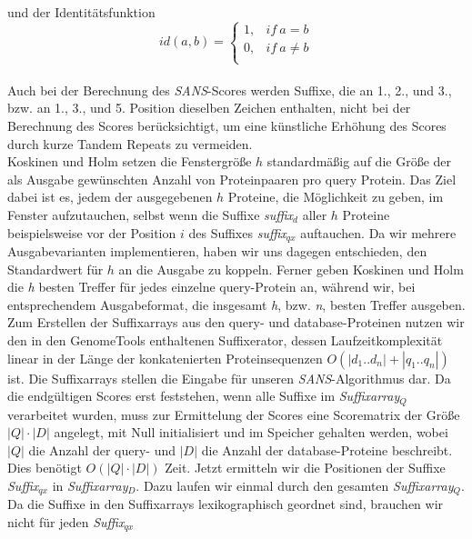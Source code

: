\documentclass{article}
\begin{document}
und der Identitätsfunktion\\

\begin{equation*}
id(a,b)=\begin{cases}
  1,  & if~a=b\\
  0,  & if~a\ne b\\
\end{cases}
\end{equation*}\\

Auch bei der Berechnung des \emph{SANS}-Scores werden Suffixe, die an 1., 2., und 3., bzw. an 1., 3., und 5. Position dieselben Zeichen enthalten, nicht bei der Berechnung des Scores berücksichtigt, um eine künstliche Erhöhung des Scores durch kurze Tandem Repeats zu vermeiden.\\
Koskinen und Holm setzen die Fenstergröße $h$ standardmäßig auf die Größe der als
Ausgabe gewünschten Anzahl von Proteinpaaren pro query Protein. 
Das Ziel dabei ist es, jedem der ausgegebenen $h$ Proteine, die Möglichkeit zu
geben, im Fenster aufzutauchen, selbst wenn die Suffixe \emph{suffix$_{d}$}
aller $h$ Proteine beispielsweise vor der Position $i$ des Suffixes
\emph{suffix$_{qx}$} auftauchen. 
Da wir mehrere Ausgabevarianten implementieren, haben wir uns dagegen entschieden, den Standardwert für $h$ an die Ausgabe zu koppeln. Ferner geben Koskinen und Holm die \textit h besten Treffer für jedes einzelne query-Protein an, während wir, bei entsprechendem Ausgabeformat, die insgesamt \textit h, bzw. \textit n, besten Treffer ausgeben.\\
Zum Erstellen der Suffixarrays aus den query- und database-Proteinen nutzen wir
den in den GenomeTools enthaltenen Suffixerator, dessen Laufzeitkomplexität
linear in der Länge der konkatenierten Proteinsequenzen $O(|d_1..d_n|+|q_1..q_n|)$ ist.
Die Suffixarrays stellen die Eingabe für unseren  \emph{SANS}-Algorithmus dar.
Da die endgültigen Scores erst feststehen, wenn alle Suffixe im
\emph{Suffixarray$_Q$}
verarbeitet wurden, muss zur Ermittelung der Scores eine Scorematrix der Größe
$|Q|\cdot|D|$ angelegt, mit Null initialisiert und im Speicher gehalten werden, wobei $|Q|$ die Anzahl
der query- und $|D|$ die Anzahl der database-Proteine beschreibt. Dies benötigt
$O(|Q|\cdot|D|)$ Zeit. Jetzt ermitteln wir die Positionen der Suffixe
\emph{Suffix$_{qx}$} in \emph{Suffixarray$_D$}. Dazu laufen wir einmal durch
den gesamten \emph{Suffixarray$_Q$}. Da die Suffixe in den Suffixarrays
lexikographisch geordnet sind, brauchen wir nicht für jeden \emph{Suffix$_{qx}$}
\end{document}

